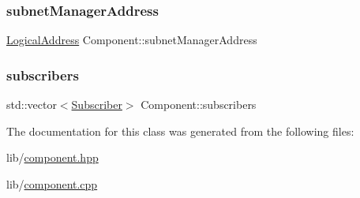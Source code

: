 \subsubsection{\texorpdfstring{subnet\+Manager\+Address}{subnetManagerAddress}}
{\footnotesize\ttfamily \hyperlink{structLogicalAddress}{Logical\+Address} Component\+::subnet\+Manager\+Address\hspace{0.3cm}{\ttfamily [protected]}}

\mbox{\label{classComponent_a4b1fc3511ba706058d5e575e5b4b55f7}} 
\subsubsection{\texorpdfstring{subscribers}{subscribers}}
{\footnotesize\ttfamily std\+::vector$<$\hyperlink{structSubscriber}{Subscriber}$>$ Component\+::subscribers}



The documentation for this class was generated from the following files\+:\begin{DoxyCompactItemize}
\item 
lib/\hyperlink{component_8hpp}{component.\+hpp}\item 
lib/\hyperlink{component_8cpp}{component.\+cpp}\end{DoxyCompactItemize}
